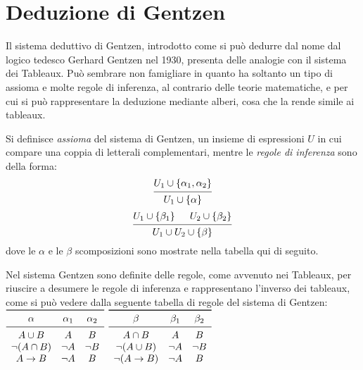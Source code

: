 \section{Deduzione di Gentzen}
Il sistema deduttivo di Gentzen, introdotto come si può dedurre dal nome dal logico
tedesco Gerhard Gentzen nel 1930, presenta delle analogie con il sistema dei Tableaux.
Può sembrare non famigliare in quanto ha soltanto un tipo di assioma e molte regole
di inferenza, al contrario delle teorie matematiche, e per cui si può rappresentare
la deduzione mediante alberi, cosa che la rende simile ai tableaux.

\begin{defi}
Si definisce \emph{assioma} del sistema di Gentzen, un insieme di espressioni $U$
in cui compare una coppia di letterali complementari, mentre le \emph{regole di inferenza}
sono della forma:
\begin{equation*}
\begin{prooftree}
\hypo{U_1 \cup \{\alpha_1,\alpha_2\}}
\infer1{U_1 \cup \{\alpha\}}
\end{prooftree}
\end{equation*}
\begin{equation*}
\begin{prooftree}
\hypo{U_1 \cup \{\beta_1\}}
\hypo{U_2 \cup \{\beta_2\}}
\infer2{U_1 \cup U_2 \cup \{\beta\}}
\end{prooftree}
\end{equation*}
dove le $\alpha$ e le $\beta$ scomposizioni sono mostrate nella tabella qui di seguito.
\end{defi}

Nel sistema Gentzen sono definite delle regole, come avvenuto nei Tableaux, per
riuscire a desumere le regole di inferenza e rappresentano l'inverso dei tableaux,
 come si può vedere dalla seguente tabella di regole del sistema di Gentzen:
$\begin{array}{ccc}
\toprule
\alpha & \alpha_1 & \alpha_2 \\
\midrule
A \cup B & A & B \\
\neg(A \cap B) & \neg A & \neg B \\
A \rightarrow B & \neg A & B \\
\end{array}$
$\begin{array}{ccc}
\toprule
\beta & \beta_1 & \beta_2 \\
\midrule
A \cap B & A & B \\
\neg(A \cup B) & \neg A & \neg B \\
\neg(A \rightarrow B) & \neg A & B \\
\end{array}$

